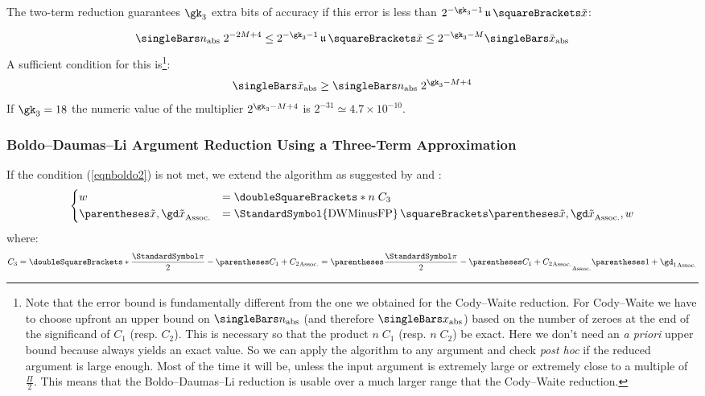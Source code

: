 \documentclass[10pt, a4paper, twoside]{basestyle}
\DeclareMathOperator{\ULP}{\mathfrak u}
\DeclareMathOperator{\dwminusfp}{\StandardSymbol{DWMinusFP}}
\newcommand{\round}[1]{\doubleSquareBrackets*{#1}}
\newcommand{\red}[1]{\tilde{#1}}
\begin{document}
The two-term reduction guarantees $\gk_3$ extra bits of accuracy if this error is less than $2^{-\gk_3 - 1} \ULP\of{\red x}$:

\[
\abs{n} \; 2^{-2 M + 4} \leq 2^{-\gk_3 - 1} \ULP\of{\red x} \leq 2^{-\gk_3 - M} \abs{\red x}
\]
A sufficient condition for this is\footnote{Note that the error bound is fundamentally different from the one we obtained for the Cody--Waite reduction.  For Cody--Waite we have to choose upfront an upper bound on $\abs{n}$ (and therefore $\abs{x}$) based on the number of zeroes at the end of the significand of $C_1$ (resp. $C_2$).  This is necessary so that the product $n \; C_1$ (resp. $n \; C_2$) be exact.  Here we don't need an \emph{a priori} upper bound because \cite{BoldoDaumasLi2009} always yields an exact value.  So we can apply the algorithm to any argument and check \emph{post hoc} if the reduced argument is large enough.  Most of the time it will be, unless the input argument is extremely large or extremely close to a multiple of $\frac{\Pi}{2}$.  This means that the Boldo--Daumas--Li reduction is usable over a much larger range that the Cody--Waite reduction.}:
\begin{equation}
\abs{\red x} \geq \abs{n} \; 2^{\gk_3 - M + 4}
\label{eqnboldo2}
\end{equation}
If $\gk_3 = 18$ the numeric value of the multiplier $2^{\gk_3 - M + 4}$ is $2^{-31} \simeq 4.7 \times 10^{-10}$.

\subsubsection*{Boldo--Daumas--Li Argument Reduction Using a Three-Term Approximation}

If the condition (\ref{eqnboldo2}) is not met, we extend the algorithm as suggested by \cite[1139]{BoldoDaumasLi2009} and \cite[205]{Muller2016}:
\[
\begin{dcases}
w &= \round{n \; C_3} \\
\pa{\red x, \gd \red x} &= \dwminusfp\of{\pa{\red x, \gd \red x}, w}
\end{dcases}
\]
where:
\[
C_3 = \round{\frac{\Pi}{2} - \pa{C_1 + C_2}} = \pa{\frac{\Pi}{2} - \pa{C_1 + C_2}} \pa{1 + \gd_1}
\]
\end{document}
